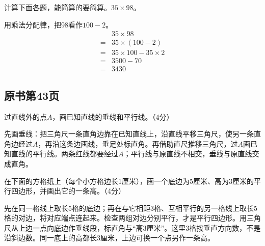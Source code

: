 计算下面各题，能简算的要简算。\(35\times98\)。\par
\begin{BookAnswer}
用乘法分配律，把98看作\(100-2\)。\[\begin{aligned}&35\times98\\={}&35\times(100-2)\\={}&35\times100-35\times2\\={}&3500-70\\={}&3430\end{aligned}\]
\end{BookAnswer}



\subsection*{原书第43页}

过直线外的点\(A\)，画已知直线的垂线和平行线。（4分）\par
{}
\begin{BookAnswer}
先画垂线：把三角尺一条直角边靠在已知直线上，沿直线平移三角尺，使另一条直角边经过\(A\)，再沿这条边画线，垂足处标直角。再借助直尺推移三角尺，过\(A\)画已知直线的平行线。两条红线都要经过\(A\)；平行线与原直线不相交，垂线与原直线交成直角。
\end{BookAnswer}

在下面的方格纸上（每个小方格边长1厘米），画一个底边为5厘米、高为3厘米的平行四边形，并画出它的一条高。（4分）\par
{}
\begin{BookAnswer}
先在同一格线上取长5格的底边；再在与它相距3格、互相平行的另一格线上取长5格的对边，将对应端点连起来。检查两组对边分别平行，才是平行四边形。用三角尺从上边一点向底边作垂线段，标直角与“高3厘米”。这里3格按垂直方向数，不是沿斜边数。同一底上的高都长3厘米，上边可换一个点另作一条高。
\end{BookAnswer}

